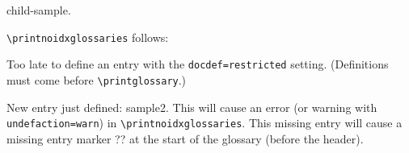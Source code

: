 \documentclass{article}
\begin{document}

\gls{child-sample}.

\verb|\printnoidxglossaries| follows:
\printnoidxglossaries

Too late to define an entry with the \texttt{docdef=restricted}
setting. (Definitions must come before \verb|\printglossary|.)


New entry just defined: \gls{sample2}.
This will cause an error (or warning with \texttt{undefaction=warn})
in \verb|\printnoidxglossaries|.
This missing entry will cause a missing entry marker ?? 
at the start of the glossary (before the header).
\end{document}
